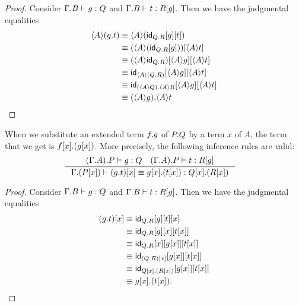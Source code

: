\begin{proof}
Consider $\jterm{{\Gamma}{B}}{Q}{g}$ and $\jterm{{\Gamma}{B}}{\subst{g}{R}}{t}$.
Then we have the judgmental equalities
\begin{align*}
\ctxwk{A}{\ctxext{g}{t}}
& \jdeq \ctxwk{A}{\subst{t}{{g}{\idfunc[\ctxext{Q}{R}]}}}\\
& \jdeq \subst{\ctxwk{A}{t}}{\ctxwk{A}{\subst{g}{\idfunc[\ctxext{Q}{R}]}}}\\
& \jdeq \subst{\ctxwk{A}{t}}{{\ctxwk{A}{g}}{\ctxwk{A}{\idfunc[\ctxext{Q}{R}]}}}\\
& \jdeq \subst{\ctxwk{A}{t}}{{\ctxwk{A}{g}}{\idfunc[\ctxwk{A}{\ctxext{Q}{R}}]}}\\
& \jdeq \subst{\ctxwk{A}{t}}{{\ctxwk{A}{g}}{\idfunc[\ctxext{\ctxwk{A}{Q}}{\ctxwk{A}{R}}]}}\\
& \jdeq \ctxext{\ctxwk{A}{g}}{\ctxwk{A}{t}}
\end{align*}
\end{proof}

\begin{lem}
When we substitute an extended term $\ctxext{f}{g}$ of $\ctxext{P}{Q}$ by a term
$x$ of $A$, the term that we get is $\ctxext{\subst{x}{f}}{\subst{x}{g}}$.
More precisely, the following inference rules are valid:
\begin{align*}
& \inference{\jterm{{{\Gamma}{A}}{P}}{Q}{g}\quad\jterm{{{\Gamma}{A}}{P}}{\subst{g}{R}}{t}}{\jtermeq{{\Gamma}{\subst{x}{P}}}{\ctxext{\subst{x}{Q}}{\subst{x}{R}}}{\subst{x}{\ctxext{g}{t}}}{\ctxext{\subst{x}{g}}{\subst{x}{t}}}}
\end{align*}
\end{lem}

\begin{proof}
Consider $\jterm{{\Gamma}{B}}{Q}{g}$ and $\jterm{{\Gamma}{B}}{\subst{g}{R}}{t}$.
Then we have the judgmental equalities
\begin{align*}
\subst{x}{\ctxext{g}{t}}
& \jdeq \subst{x}{{t}{{g}{\idfunc[\ctxext{Q}{R}]}}}\\
& \jdeq \subst{{x}{t}}{{x}{{g}{\idfunc[\ctxext{Q}{R}]}}}\\
& \jdeq \subst{{x}{t}}{{{x}{g}}{{x}{\idfunc[\ctxext{Q}{R}]}}}\\
& \jdeq \subst{{x}{t}}{{{x}{g}}{\idfunc[\subst{x}{\ctxext{Q}{R}}]}}\\
& \jdeq \subst{{x}{t}}{{{x}{g}}{\idfunc[\ctxext{\subst{x}{Q}}{\subst{x}{R}}]}}\\
& \jdeq \ctxext{\subst{x}{g}}{\subst{x}{t}}.
\end{align*}
\end{proof}

